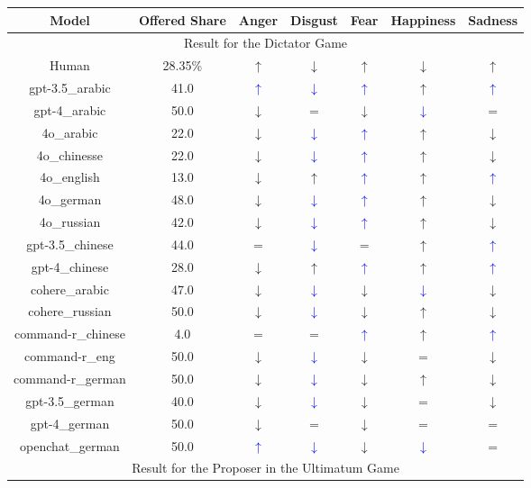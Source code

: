 \documentclass{article}
\newcommand{\bluearrow}[1]{\textcolor{blue}{#1}}
\begin{document}
\begin{table}
    \centering
    \begin{tabular}{ccccccc}
         Model & Offered Share & Anger & Disgust & Fear & Happiness & Sadness \\
         \hline
         \multicolumn{7}{c}{Result for the Dictator Game}\\

Human        & 28.35\%  & $\uparrow$ & $\downarrow$ & $\uparrow$ & $\downarrow$ & $\uparrow$ \\  
gpt-3.5\_arabic & 41.0 & \bluearrow{$\uparrow$} & \bluearrow{$\downarrow$} & \bluearrow{$\uparrow$} & $\uparrow$ & \bluearrow{$\uparrow $}\\
gpt-4\_arabic & 50.0 & $\downarrow$ & $=$ & $\downarrow$ & \bluearrow{$\downarrow$} & $= $\\
4o\_arabic & 22.0 & $\downarrow$ & \bluearrow{$\downarrow$} & \bluearrow{$\uparrow$} & $\uparrow$ & $\downarrow $\\
4o\_chinesse & 22.0 & $\downarrow$ & \bluearrow{$\downarrow$} & \bluearrow{$\uparrow$} & $\uparrow$ & $\downarrow $\\
4o\_english & 13.0 & $\downarrow$ & $\uparrow$ & \bluearrow{$\uparrow$} & $\uparrow$ & \bluearrow{$\uparrow $}\\
4o\_german & 48.0 & $\downarrow$ & \bluearrow{$\downarrow$} & \bluearrow{$\uparrow$} & $\uparrow$ & $\downarrow $\\
4o\_russian & 42.0 & $\downarrow$ & \bluearrow{$\downarrow$} & \bluearrow{$\uparrow$} & $\uparrow$ & $\downarrow $\\
gpt-3.5\_chinese & 44.0 & $=$ & \bluearrow{$\downarrow$} & $=$ & $\uparrow$ & \bluearrow{$\uparrow $}\\
gpt-4\_chinese & 28.0 & $\downarrow$ & $\uparrow$ & \bluearrow{$\uparrow$} & $\uparrow$ & \bluearrow{$\uparrow $}\\
cohere\_arabic & 47.0 & $\downarrow$ & \bluearrow{$\downarrow$} & $\downarrow$ & \bluearrow{$\downarrow$} & $\downarrow $\\
cohere\_russian & 50.0 & $\downarrow$ & \bluearrow{$\downarrow$} & $\downarrow$ & $\uparrow$ & $\downarrow $\\
command-r\_chinese & 4.0 & $=$ & $=$ & \bluearrow{$\uparrow$} & $\uparrow$ & \bluearrow{$\uparrow $}\\
command-r\_eng & 50.0 & $\downarrow$ & \bluearrow{$\downarrow$} & $\downarrow$ & $=$ & $\downarrow $\\
command-r\_german & 50.0 & $\downarrow$ & \bluearrow{$\downarrow$} & $\downarrow$ & $\uparrow$ & $\downarrow $\\
gpt-3.5\_german & 40.0 & $\downarrow$ & \bluearrow{$\downarrow$} & $\downarrow$ & $=$ & $\downarrow $\\
gpt-4\_german & 50.0 & $\downarrow$ & $=$ & $\downarrow$ & $=$ & $= $\\
openchat\_german & 50.0 & \bluearrow{$\uparrow$} & \bluearrow{$\downarrow$} & $\downarrow$ & \bluearrow{$\downarrow$} & $= $\\
         \hline
         \multicolumn{7}{c}{Result for the Proposer in the Ultimatum Game} \\


\end{tabular}
\end{table}
\end{document}
